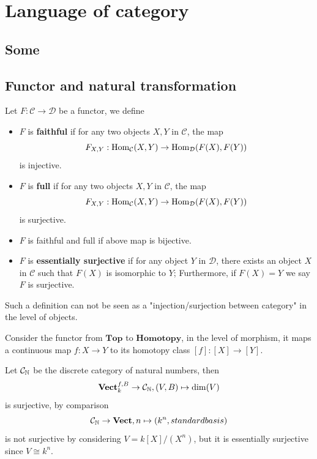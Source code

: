 \section{Language of category}

\subsection{Some}


\subsection{Functor and natural transformation}

\begin{definition}
    Let \(F: \mathcal{C} \to \mathcal{D}\) be a functor, we define
    \begin{itemize}
        \item \(F\) is \textbf{faithful} if for any two objects \(X,Y\) in \(\mathcal{C}\), the map
        \[F_{X,Y}: \operatorname{Hom}_{\mathcal{C}}(X,Y) \to \operatorname{Hom}_{\mathcal{D}}(F(X),F(Y))\]
        is injective.
        \item \(F\) is \textbf{full} if for any two objects \(X,Y\) in \(\mathcal{C}\), the map
        \[      F_{X,Y}: \operatorname{Hom}_{\mathcal{C}}(X,Y) \to \operatorname{Hom}_{\mathcal{D}}(F(X),F(Y))\]
        is surjective.      
        \item \(F\) is faithful and full if above map is bijective.
        \item \(F\) is \textbf{essentially surjective} if for any object \(Y\) in \(\mathcal{D}\), there exists an object \(X\) in \(\mathcal{C}\) such that \(F(X)\) is isomorphic to \(Y\); Furthermore, if \(F(X) = Y\) we say \(F\) is surjective.
    \end{itemize}
\end{definition}

\begin{remark}
    Such a definition can not be seen as a "injection/surjection between category" in the level of objects.
\end{remark}

\begin{example}
    Consider the functor from \(\mathbf{Top}\) to \(\mathbf{Homotopy}\), in the level of morphism, it maps a continuous map \(f: X \to Y\) to its homotopy class \([f]: [X] \to [Y]\). 
    
\end{example}

\begin{example}
    Let \(\mathcal{C}_{\mathbb{N}}\) be the discrete category of natural numbers, then
    \[\mathbf{Vect}^{f,B}_{k} \to \mathcal{C}_{\mathbb{N}}, (V,B) \mapsto \dim(V)\]
    is surjective, by comparison
    \[\mathcal{C}_{\mathbb{N}} \to \mathbf{Vect}, n \mapsto (k^n,standard basis)\]
    is not surjective by considering \(V = k[X]/(X^n)\), but it is essentially surjective since \(V \cong k^n\).
\end{example}

